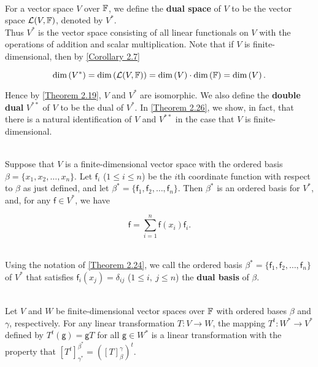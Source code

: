 \begin{definition}
	\hfill\\
	For a vector space $V$ over $\mathbb{F}$, we define the \textbf{dual space} of $V$ to be the vector space $\mathcal{L}(V, \mathbb{F})$, denoted by $V^*$.\\

	Thus $V^*$ is the vector space consisting of all linear functionals on $V$ with the operations of addition and scalar multiplication. Note that if $V$ is finite-dimensional, then by \autoref{Corollary 2.7}

	\[\text{dim}\left(V^*\right)= \text{dim}\left(\mathcal{L}(V,\mathbb{F})\right) = \text{dim}\left(V\right) \cdot \text{dim}\left(\mathbb{F}\right) = \text{dim}\left(V\right).\]

	Hence by \autoref{Theorem 2.19}, $V$ and $V^*$ are isomorphic. We also define the \textbf{double dual} $V^{**}$ of $V$ to be the dual of $V^*$. In \autoref{Theorem 2.26}, we show, in fact, that there is a natural identification of $V$ and $V^{**}$ in the case that $V$ is finite-dimensional.
\end{definition}

\begin{theorem}\label{Theorem 2.24}
	\hfill\\
	Suppose that $V$ is a finite-dimensional vector space with the ordered basis $\beta = \{x_1, x_2, \dots, x_n\}$. Let $\mathsf{f}_i$ ($1 \leq i \leq n$) be the $i$th coordinate function with respect to $\beta$ as just defined, and let $\beta^*=\{\mathsf{f}_1, \mathsf{f}_2, \dots, \mathsf{f}_n\}$. Then $\beta^*$ is an ordered basis for $V^*$, and, for any $\mathsf{f} \in V^*$, we have

	\[\mathsf{f} = \sum_{i=1}^{n}\mathsf{f}(x_i)\mathsf{f}_i.\]
\end{theorem}

\begin{definition}
	\hfill\\
	Using the notation of \autoref{Theorem 2.24}, we call the ordered basis $\beta^* = \{\mathsf{f}_1, \mathsf{f}_2, \dots, \mathsf{f}_n\}$ of $V^*$ that satisfies $\mathsf{f}_i(x_j) = \delta_{ij}$ ($1 \leq i,\ j \leq n$) the \textbf{dual basis} of $\beta$.
\end{definition}

\begin{theorem}\label{Theorem 2.25}
	\hfill\\
	Let $V$ and $W$ be finite-dimensional vector spaces over $\mathbb{F}$ with ordered bases $\beta$ and $\gamma$, respectively. For any linear transformation $T: V \to W$, the mapping $T^t: W^* \to V^*$ defined by $T^t(\mathsf{g}) = \mathsf{g}T$ for all $\mathsf{g} \in W^*$ is a linear transformation with the property that $[T^t]_{\gamma^*}^{\beta^*} = ([T]_\beta^\gamma)^t$.
\end{theorem}

